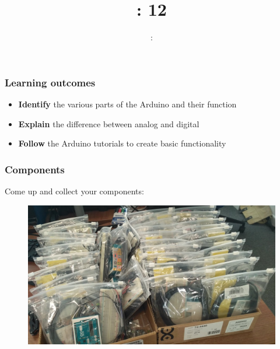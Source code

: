 \usepackage{../../beamerthemeFalmouthGamesAcademy}
\usepackage{multimedia}
\graphicspath{ {../../} }


\usepackage[normalem]{ulem}
\usepackage{wasysym}
\usepackage{listings}
\usepackage{pdfpages}

\usetikzlibrary{arrows,automata}




\title{\sessionnumber: 12}
\subtitle{\modulecode: \moduletitle}

\frame{\titlepage}

\begin{frame}
	\frametitle{Learning outcomes}
	\begin{itemize}
		\item \textbf{Identify} the various parts of the Arduino and their function
		\item \textbf{Explain} the difference between analog and digital
		\item \textbf{Follow} the Arduino tutorials to create basic functionality
	\end{itemize}
\end{frame}

\begin{frame}
	\frametitle{Components}
	Come up and collect your components:
	\begin{figure}
		\includegraphics[scale=.2]{assets/kit}  
	\end{figure}
\end{frame}


